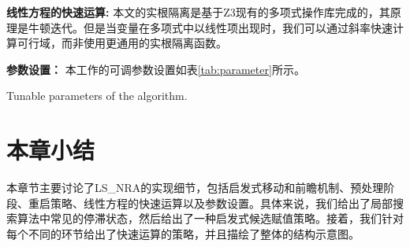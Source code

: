 \textbf{线性方程的快速运算:} 本文的实根隔离是基于Z3现有的多项式操作库完成的，其原理是牛顿迭代。但是当变量在多项式中以线性项出现时，我们可以通过斜率快速计算可行域，而非使用更通用的实根隔离函数。

\textbf{参数设置：} 本工作的可调参数设置如表\ref{tab:parameter}所示。

\begin{table}[]
    \centering
         {Tunable parameters of the algorithm.}
\label{tab:parameter}
\end{table}

\section{本章小结}
本章节主要讨论了LS\_NRA的实现细节，包括启发式移动和前瞻机制、预处理阶段、重启策略、线性方程的快速运算以及参数设置。具体来说，我们给出了局部搜索算法中常见的停滞状态，然后给出了一种启发式候选赋值策略。接着，我们针对每个不同的环节给出了快速运算的策略，并且描绘了整体的结构示意图。